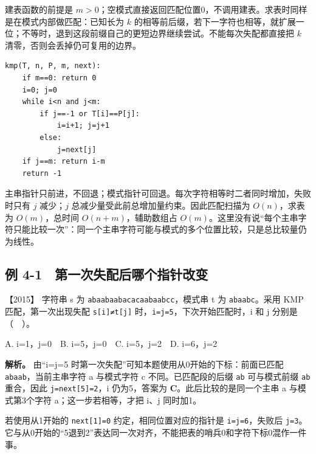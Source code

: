 建表函数的前提是 \(m>0\)；空模式直接返回匹配位置0，不调用建表。求表时同样是在模式内部做匹配：已知长为 \(k\) 的相等前后缀，若下一字符也相等，就扩展一位；不等时，退到这段前缀自己的更短边界继续尝试。不能每次失配都直接把 \(k\) 清零，否则会丢掉仍可复用的边界。

\par\medskip\noindent
\begin{minipage}{\linewidth}
\begin{verbatim}
kmp(T, n, P, m, next):
    if m==0: return 0
    i=0; j=0
    while i<n and j<m:
        if j==-1 or T[i]==P[j]:
            i=i+1; j=j+1
        else:
            j=next[j]
    if j==m: return i-m
    return -1
\end{verbatim}
\end{minipage}\par\medskip

主串指针只前进，不回退；模式指针可回退。每次字符相等时二者同时增加，失败时只有 \(j\) 减少；\(j\) 总减少量受此前总增加量约束。因此匹配扫描为 \(O(n)\)，求表为 \(O(m)\)，总时间 \(O(n+m)\)，辅助数组占 \(O(m)\)。这里没有说``每个主串字符只能比较一次''：同一个主串字符可能与模式的多个位置比较，只是总比较量仍为线性。

\subsection{例 4-1　第一次失配后哪个指针改变}\label{ds-ex4-1}

\noindent{}【2015】 字符串 s 为 \allowbreak{}\texttt{abaabaabacacaabaabcc}，模式串 t 为 \allowbreak{}\texttt{abaabc}。采用 KMP 匹配，第一次出现失配 \allowbreak{}\texttt{s{[}i{]}≠t{[}j{]}} 时，\allowbreak{}\texttt{i=j=5}，下次开始匹配时，i 和 j 分别是（　）。

A. i=1，j=0　B. i=5，j=0　C. i=5，j=2　D. i=6，j=2


\textbf{解析。} 由``i=j=5 时第一次失配''可知本题使用从0开始的下标：前面已匹配 \allowbreak{}\texttt{abaab}，当前主串字符 a 与模式字符 c 不同。已匹配段的后缀 \allowbreak{}\texttt{ab} 可与模式前缀 \allowbreak{}\texttt{ab} 重合，因此 \allowbreak{}\texttt{j=next{[}5{]}=2}，i 仍为5，答案为 \textbf{C}。此后比较的是同一个主串 a 与模式第3个字符 a；这一步若相等，才把 i、j 同时加1。

若使用从1开始的 \allowbreak{}\texttt{next{[}1{]}=0} 约定，相同位置对应的指针是 \allowbreak{}\texttt{i=j=6}，失败后 \allowbreak{}\texttt{j=3}。它与从0开始的``5退到2''表达同一次对齐，不能把表的哨兵0和字符下标0混作一件事。

